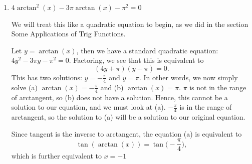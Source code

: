 \documentclass{ximera}
\begin{document}
\begin{example}
\begin{enumerate}
\begin{explanation}
{\bf But, wait! }

Remember, we had to restrict the domain of tangent in order to define an inverse function, which we called arctangent. Arctangent is the inverse of the {\it restricted} tangent function, whose domain is $\Big(\!-\frac{\pi}{2},\frac{\pi}{2}\Big)$. $\frac{5\pi}{3}$ is larger than $\frac{\pi}{2}$, so it is not within the domain of this restricted tangent function. 

Thus, we begin by simplifying $\tan\!\Big(\frac{5\pi}{3}\Big) = -\sqrt{3}$. 

Now, let's consider $\arctan(-\sqrt{3})$, recalling again the {\it range} of arctangent. We are looking for the value of $y$ in $\Big(\!-\frac{\pi}{2},\frac{\pi}{2}\Big)$ such that $\tan(y) =-\sqrt{3}$.

Hence, $y$ is $-\frac{\pi}{3}$, and we now see that 
\begin{equation*}
\arctan\!\Big(\!\tan\!\Big(\frac{5\pi}{3}\Big)\Big) = \arctan(-\sqrt{3}) = -\frac{\pi}{3}.
\end{equation*}


\end{explanation}


\item $4\arctan^2(x) - 3\pi \arctan(x) - \pi^2 = 0$\\
\begin{explanation}
	We will treat this like a quadratic equation to begin, as we did in the section Some Applications of Trig Functions. 

Let $y = \arctan(x)$, then we have a standard quadratic equation: $4y^2- 3\pi y - \pi^2=0$. Factoring, we see that this is equivalent to 
$$(4y +\pi)(y-\pi)=0.$$
%
This has two solutions: $y = -\frac{\pi}{4}$ and $y=\pi$. In other words, we now simply solve (a) $\arctan(x) = -\frac{\pi}{4}$ and (b) $\arctan(x) = \pi$. $\pi$ is not in the range of arctangent, so (b) does not have a solution. Hence, this cannot be a solution to our equation, and we must look at (a). $-\frac{\pi}{4}$ is in the range of arctangent, so the solution to (a) will be a solution to our original equation.

Since tangent is the inverse to arctangent, the equation (a) is equivalent to $$\tan(\arctan(x))=\tan\!\Big(\!-\frac{\pi}{4}\Big),$$
which is further equivalent to $x=-1$
\end{explanation}
\end{enumerate}
\end{example}
\end{document}

